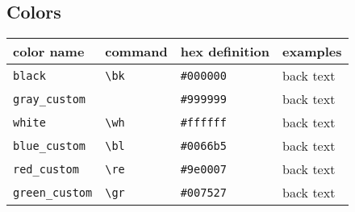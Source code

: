 \documentclass{article}
\newcommand{\gr}[0]{\color{green_custom}}
\newcommand{\re}[0]{\color{red_custom}}
\newcommand{\bl}[0]{\color{blue_custom}}
\newcommand{\bk}[0]{\color{black}}
\newcommand{\wh}[0]{\color{white}}
\begin{document}
    \subsection{Colors}
    \begin{tabulary}{\textwidth}{LLLL}
        \toprule 
        \textbf{color name} 
                    & \textbf{command} 
                                    & \textbf{hex definition} 
                                                        & \textbf{examples}             \\
        \midrule 
        \texttt{black} 
                    & \texttt{\textbackslash bk} 
                                    & \texttt{\#000000} & \colorbox{black!100}
                                                            {\wh back}
                                                            \bk text                    \\
        \texttt{gray\_custom} 
                    &  
                                    & \texttt{\#999999} & \colorbox{gray_custom!100}
                                                            {\wh back}
                                                            \color{gray_custom} text    \\
        \texttt{white} 
                    & \texttt{\textbackslash wh}
                                    & \texttt{\#ffffff} & \colorbox{white!100}
                                                            {\bk back}
                                                            \color{white} text          \\
        \texttt{blue\_custom} 
                    & \texttt{\textbackslash bl} 
                                    & \texttt{\#0066b5} & \colorbox{blue_custom!100}
                                                            {\wh back}
                                                            \bl text                    \\
        \texttt{red\_custom} 
                    & \texttt{\textbackslash re} 
                                    & \texttt{\#9e0007} & \colorbox{red_custom!100}
                                                            {\wh back}
                                                            \re text                    \\
        \texttt{green\_custom} 
                    & \texttt{\textbackslash gr} 
                                    & \texttt{\#007527} & \colorbox{green_custom!100}
                                                            {\wh back}
                                                            \gr text                    \\
        \bottomrule
    \end{tabulary}
\end{document}
